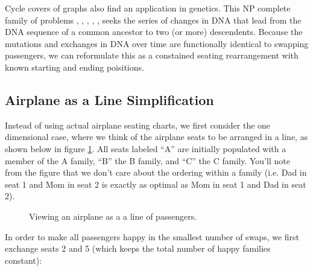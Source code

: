 \documentclass[a4paper]{article}
\begin{document}
Cycle covers of graphs also find an application in genetics.  This NP complete family of problems \cite{bryant1998complexity}, \cite{durrett2005genomic}, \cite{goldberg2001complexity}, \cite{caprara1999formulations}, \cite{sankoff1997median}, \cite{popov2007multiple} seeks the series of changes in DNA that lead from the DNA sequence of a common ancestor to two (or more) descendents.  Because the mutations and exchanges in DNA over time are functionally identical to swapping passengers, we can reformulate this as a constained seating rearrangement with known starting and ending poisitions.

\subsection{Airplane as a Line Simplification}

Instead of using actual airplane seating charts, we first consider the one dimensional case, where we think of the airplane seats to be arranged in a line, as shown below in figure \ref{fig:lineplane}.  All seats labeled ``A'' are initially populated with a member of the A family, ``B'' the B family, and ``C'' the C family.  You'll note from the figure that we don't care about the ordering within a family (i.e. Dad in seat 1 and Mom in seat 2 is exactly as optimal as Mom in seat 1 and Dad in seat 2). 

\begin{figure}[H]
\label{fig:lineplane}
\centering
{}
\caption{Viewing an airplane as a a line of passengers.}
\end{figure}

In order to make all passengers happy in the smallest number of swaps, we first exchange seats 2 and 5 (which keeps the total number of happy families constant):

\begin{figure}[H]
\centering
{}
\end{figure}
\end{document}
